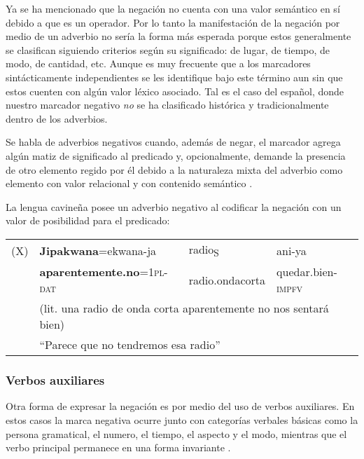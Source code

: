 Ya se ha mencionado que la negación no cuenta con una valor semántico en sí debido a que es un operador. Por lo tanto la manifestación de la negación por medio de un adverbio no sería la forma más esperada porque estos generalmente se clasifican siguiendo criterios según su significado: de lugar, de tiempo, de modo, de cantidad, etc. Aunque es muy frecuente que a los marcadores sintácticamente independientes se les identifique bajo este término aun sin que estos cuenten con algún valor léxico asociado. Tal es el caso del español, donde nuestro marcador negativo {\setmainfont{Charis SIL} \textit{no}} se ha clasificado histórica y tradicionalmente dentro de los adverbios.

Se habla de adverbios negativos cuando, además de negar, el marcador agrega algún matiz de significado al predicado y, opcionalmente, demande la presencia de otro elemento regido por él debido a la naturaleza mixta del adverbio como elemento con valor relacional y con contenido semántico \textcolor{MidnightBlue}{\citep{GiliGaya1973,PavonLucero2003}}.

La lengua cavineña posee un adverbio negativo al codificar la negación con un valor de posibilidad para el predicado\vspace{0.5cm}:

{\setmainfont{Charis SIL} 

\begin{tabular}{llll}
(X) & \textbf{Jipakwana}=ekwana-ja & radio\textsubscript{S} & ani-ya \\
& \textbf{aparentemente.no}=\textsc{1pl-dat} & radio.ondacorta & quedar.bien-\textsc{impfv}\\
& \multicolumn{3}{l}{(lit. una radio de onda corta aparentemente no nos sentará bien)} \\
& \multicolumn{3}{l}{``Parece que no tendremos esa radio'' \qquad \textcolor{MidnightBlue}{\citep[pág. 104]{cavin}}}
\end{tabular} \vspace{0.5cm}}

\subsubsection*{Verbos auxiliares}

\noindent Otra forma de expresar la negación es por medio del uso de verbos auxiliares. En estos casos la marca negativa ocurre junto con categorías verbales básicas como la persona gramatical, el numero, el tiempo, el aspecto y el modo, mientras que el verbo principal permanece en una forma invariante \textcolor{MidnightBlue}{\citep{Kim2000}}. \vspace{0.5cm}

